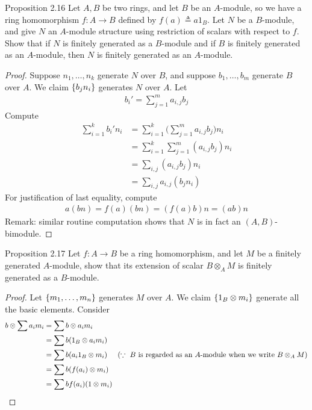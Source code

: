 \documentclass{report}
\begin{document}
\begin{question}{Proposition 2.16}{}
Let $A,B$ be two rings, and let  $B$ be an  $A$-module, so we have a ring homomorphism $f:A\rightarrow B$ defined by $f(a)\triangleq a1_B$. Let $N$ be a $B$-module, and give $N$ an  $A$-module structure using restriction of scalars with respect to  $f$.\\

Show that if $N$ is finitely generated as a $B$-module and  if $B$ is finitely generated as an  $A$-module, then  $N$ is finitely generated as an $A$-module. 
\end{question}
\begin{proof}
Suppose $n_1,\dots ,n_k$ generate $N$ over  $B$, and suppose  $b_1,\dots ,b_m$ generate $B$ over $A$. We claim  $\{ b_jn_i \}$ generates $N$ over $A$. Let 
\begin{align*}
b_i'= \sum_{j=1}^m a_{i,j}b_j
\end{align*}
Compute 
\begin{align*}
\sum_{i=1}^k b_i'n_i&= \sum_{i=1}^k \Big(\sum_{j=1}^m a_{i,j}b_j \Big)n_i \\
&=\sum_{i=1}^k  \sum_{j=1}^m (a_{i,j}b_j)n_i  \\
&=\sum_{i,j} (a_{i,j}b_j) n_i \\
&=\sum_{i,j}a_{i,j}(b_jn_i)
\end{align*}
For justification of last equality, compute 
\begin{align*}
a(bn)=f(a)(bn)=(f(a)b)n=(ab)n
\end{align*}
Remark: similar routine computation shows that $N$ is in fact an  $(A,B)$-bimodule. 
\end{proof}
\begin{question}{Proposition 2.17}{}
Let $f:A\rightarrow B$ be a ring homomorphism, and let $M$ be a finitely generated $A$-module, show that its extension of scalar  $B\otimes_A M$ is finitely generated as a $B$-module.   
\end{question}
\begin{proof}
Let $\{ m_1,\dots ,m_n \}$ generates $M$ over $A$. We claim $\{ 1_B\otimes m_i \}$ generate all the basic elements. Consider 
\begin{align*}
b \otimes \sum a_im_i&= \sum b\otimes a_i m_i \\
&= \sum b (1_B \otimes a_im_i)\\
&=\sum b ( a_i 1_B \otimes  m_i) \hspace{0.5cm}(\because \text{ $B$ is regarded as an  $A$-module when we write }B\otimes _A M)\\
&=\sum b (f(a_i)\otimes m_i)\\
&=\sum bf(a_i)(1\otimes m_i)
\end{align*}
\end{proof}
\end{document}
